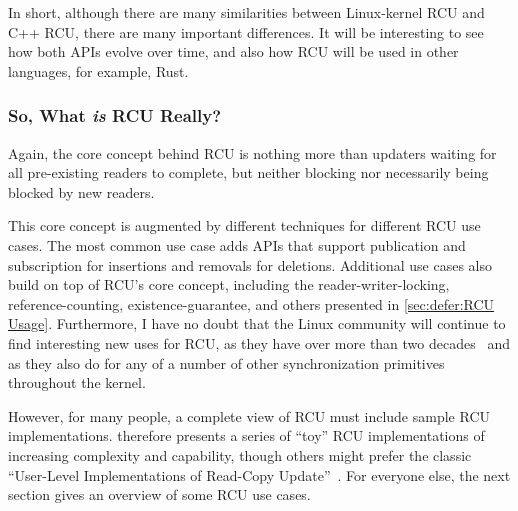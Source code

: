 In short, although there are many similarities between Linux-kernel RCU
and C++ RCU, there are many important differences.
It will be interesting to see how both APIs evolve over time, and also
how RCU will be used in other languages, for example, Rust.

\subsubsection{So, What \emph{is} RCU Really?}
\label{sec:defer:So; What is RCU Really?}

Again, the core concept behind RCU is nothing more than updaters waiting
for all pre-existing readers to complete, but neither blocking nor
necessarily being blocked by new readers.

This core concept is augmented by different techniques for different
RCU use cases.
The most common use case adds APIs that support publication and
subscription for insertions and removals for deletions.
Additional use cases also build on top of RCU's core concept, including
the reader-writer-locking, reference-counting, existence-guarantee,
and others presented in
\cref{sec:defer:RCU Usage}.
Furthermore, I have no doubt that the Linux community will continue to
find interesting new uses for RCU, as they have over more than two
decades~\cite{PaulEMcKenney2008WhatIsRCUAPI,PaulEMcKenney2024RCUAPI}
and as they also do for any of a number of other synchronization primitives
throughout the kernel.

However, for many people, a complete view of RCU must include sample
RCU implementations.
 therefore presents a series
of ``toy'' RCU implementations of increasing complexity and capability,
though others might prefer the classic
``User-Level Implementations of Read-Copy
Update''~\cite{MathieuDesnoyers2012URCU}.
For everyone else, the next section gives an overview of some RCU use cases.
